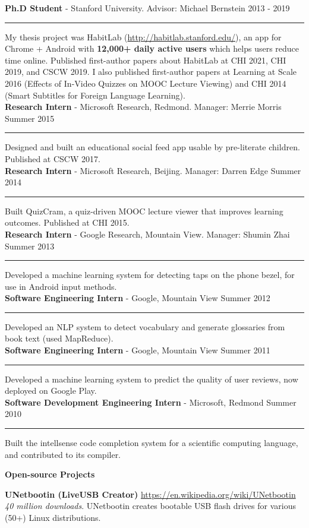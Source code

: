 \documentclass[10pt,A4]{article}
\newcommand{\cvsection}[1]
{
	\begin{center}
		\large\textcolor{sectcol}{\textbf{#1}}
	\end{center}
}
\newcommand{\cvevtzero}[4]
{

	\textbf{#2} - \textcolor{bgcol}{#3} \hfill \vspace{2.5pt}\textcolor{sectcol}{#1}

\vspace{-8pt}
\textcolor{softcol}{\hrule}
\vspace{6pt}

}
\newcommand{\cvevtone}[4]
{

	\textbf{#2} - \textcolor{bgcol}{#3} \hfill \vspace{2.5pt}\textcolor{sectcol}{#1}

\vspace{-8pt}
\textcolor{softcol}{\hrule}
\vspace{6pt}

  #4\\[3pt]

}
\begin{document}
\cvevtzero{2013 - 2019}{Ph.D Student}{Stanford University. Advisor: Michael Bernstein}\\
My thesis project was HabitLab (\url{http://habitlab.stanford.edu/}), an app for Chrome + Android with \textbf{12,000+ daily active users} which helps users reduce time online. Published first-author papers about HabitLab at CHI 2021, CHI 2019, and CSCW 2019. I also published first-author papers at Learning at Scale 2016 (Effects of In-Video Quizzes on MOOC Lecture Viewing) and CHI 2014 (Smart Subtitles for Foreign Language Learning).\\ %

%
\cvevtone{Summer 2015}{Research Intern}{Microsoft Research, Redmond. Manager: Merrie Morris}{Designed and built an educational social feed app usable by pre-literate children. Published at CSCW 2017.}

\cvevtone{Summer 2014}{Research Intern}{Microsoft Research, Beijing. Manager: Darren Edge}{Built QuizCram, a quiz-driven MOOC lecture viewer that improves learning outcomes. Published at CHI 2015.}

\cvevtone{Summer 2013}{Research Intern}{Google Research, Mountain View. Manager: Shumin Zhai}{Developed a machine learning system for detecting taps on the phone bezel, for use in Android input methods.}

\cvevtone{Summer 2012}{Software Engineering Intern}{Google, Mountain View}{Developed an NLP system to detect vocabulary and generate glossaries from book text (used MapReduce).}

\cvevtone{Summer 2011}{Software Engineering Intern}{Google, Mountain View}{Developed a machine learning system to predict the quality of user reviews, now deployed on Google Play.}

\cvevtone{Summer 2010}{Software Development Engineering Intern}{Microsoft, Redmond}{Built the intellsense code completion system for a scientific computing language, and contributed to its compiler.}


\cvsection{Open-source Projects}

\textbf{UNetbootin (LiveUSB Creator)} \hfill \url{https://en.wikipedia.org/wiki/UNetbootin}\\ %
\emph{40 million downloads}. UNetbootin creates bootable USB flash drives for various (50+) Linux distributions.\\ %
\end{document}
